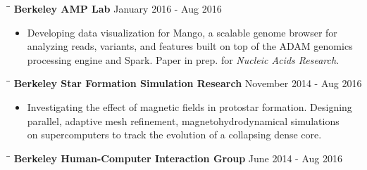 \documentclass{res}
\begin{document}
\begin{resume}
     \begin{tabbing}
   \hspace{2.3in}\= \hspace{2.6in}\= \kill 
   \vspace{-20pt}
    {\bf Berkeley AMP Lab}  \>\hspace{180 pt}  January 2016 - Aug 2016
        \\ 
   \end{tabbing}    
    \begin{itemize}
     \vspace{-20pt}
     \item  Developing data visualization for Mango, a scalable genome browser for \\analyzing reads, variants, and features built on top of the ADAM genomics \\processing engine and Spark.  Paper in prep. for \textit{Nucleic Acids Research}.
     \end{itemize}
     \vspace{-20pt}   
     \begin{tabbing}
   \hspace{2.3in}\= \hspace{2.6in}\= \kill 
    {\bf Berkeley Star Formation Simulation Research}  \>\hspace{171pt}  November 2014 - Aug 2016
        \\ 
   \end{tabbing}    
    \begin{itemize}
     \vspace{-20pt}
     \item  Investigating the effect of magnetic fields in protostar formation. Designing\\ parallel, adaptive mesh refinement, magnetohydrodynamical simulations \\ on supercomputers to track the evolution of a collapsing dense core.
     \end{itemize}
     \vspace{-20pt}
        \begin{tabbing}
   \hspace{2.3in}\= \hspace{2.6in}\= \kill 
    {\bf  Berkeley Human-Computer Interaction Group} \>\hspace{193pt}  June 2014 - Aug 2016
        \\ 
   \end{tabbing}  
   \vspace{-20pt}

\end{resume}
\end{document}
